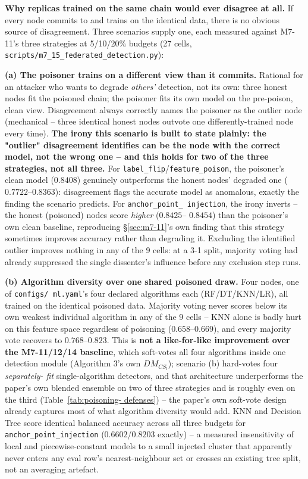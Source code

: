 \documentclass[conference]{IEEEtran}
\begin{document}
\textbf{Why replicas trained on the same chain would ever disagree at all.} If every node commits
to and trains on the identical data, there is no obvious source of disagreement. Three scenarios
supply one, each measured against M7-11's three strategies at 5/10/20\% budgets (27 cells,
\texttt{scripts/m7\_15\_federated\_detection.py}):

\textbf{(a) The poisoner trains on a different view than it commits.} Rational for an attacker
who wants to degrade \emph{others'} detection, not its own: three honest nodes fit the poisoned
chain; the poisoner fits its own model on the pre-poison, clean view. Disagreement always
correctly names the poisoner as the outlier node (mechanical -- three identical honest nodes
outvote one differently-trained node every time). \textbf{The irony this scenario is built to
state plainly: the "outlier" disagreement identifies can be the node with the correct model, not
the wrong one -- and this holds for two of the three strategies, not all three.} For
\texttt{label\_flip}/\texttt{feature\_poison}, the poisoner's clean model ($0.8408$) genuinely
outperforms the honest nodes' degraded one ($0.7722$--$0.8363$): disagreement flags the accurate
model as anomalous, exactly the finding the scenario predicts. For \texttt{anchor\_point\_
injection}, the irony inverts -- the honest (poisoned) nodes score \emph{higher} ($0.8425$--
$0.8454$) than the poisoner's own clean baseline, reproducing \S\ref{sec:m7-11}'s own finding that
this strategy sometimes improves accuracy rather than degrading it. Excluding the identified
outlier improves nothing in any of the 9 cells: at a 3-1 split, majority voting had already
suppressed the single dissenter's influence before any exclusion step runs.

\textbf{(b) Algorithm diversity over one shared poisoned draw.} Four nodes, one of \texttt{configs/
ml.yaml}'s four declared algorithms each (RF/DT/KNN/LR), all trained on the identical poisoned
data. Majority voting never scores below its own weakest individual algorithm in any of the 9
cells -- KNN alone is badly hurt on this feature space regardless of poisoning ($0.658$--$0.669$),
and every majority vote recovers to $0.768$--$0.823$. This is \textbf{not a like-for-like
improvement over the M7-11/12/14 baseline}, which soft-votes all four algorithms inside one
detection module (Algorithm 3's own $DM_{CS_l}$); scenario (b) hard-votes four \emph{separately-
fit} single-algorithm detectors, and that architecture underperforms the paper's own blended
ensemble on two of three strategies and is roughly even on the third (Table~\ref{tab:poisoning-
defenses}) -- the paper's own soft-vote design already captures most of what algorithm diversity
would add. KNN and Decision Tree score identical balanced accuracy across all three budgets for
\texttt{anchor\_point\_injection} ($0.6602$/$0.8203$ exactly) -- a measured insensitivity of local
and piecewise-constant models to a small injected cluster that apparently never enters any eval
row's nearest-neighbour set or crosses an existing tree split, not an averaging artefact.
\end{document}
